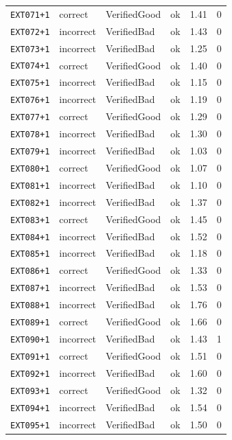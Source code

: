 \begin{longtable}{@{}l l l l r r@{}}
\texttt{EXT071{+}1} & correct & VerifiedGood & ok & 1.41 & 0 \\
\texttt{EXT072{+}1} & incorrect & VerifiedBad & ok & 1.43 & 0 \\
\texttt{EXT073{+}1} & incorrect & VerifiedBad & ok & 1.25 & 0 \\
\texttt{EXT074{+}1} & correct & VerifiedGood & ok & 1.40 & 0 \\
\texttt{EXT075{+}1} & incorrect & VerifiedBad & ok & 1.15 & 0 \\
\texttt{EXT076{+}1} & incorrect & VerifiedBad & ok & 1.19 & 0 \\
\texttt{EXT077{+}1} & correct & VerifiedGood & ok & 1.29 & 0 \\
\texttt{EXT078{+}1} & incorrect & VerifiedBad & ok & 1.30 & 0 \\
\texttt{EXT079{+}1} & incorrect & VerifiedBad & ok & 1.03 & 0 \\
\texttt{EXT080{+}1} & correct & VerifiedGood & ok & 1.07 & 0 \\
\texttt{EXT081{+}1} & incorrect & VerifiedBad & ok & 1.10 & 0 \\
\texttt{EXT082{+}1} & incorrect & VerifiedBad & ok & 1.37 & 0 \\
\texttt{EXT083{+}1} & correct & VerifiedGood & ok & 1.45 & 0 \\
\texttt{EXT084{+}1} & incorrect & VerifiedBad & ok & 1.52 & 0 \\
\texttt{EXT085{+}1} & incorrect & VerifiedBad & ok & 1.18 & 0 \\
\texttt{EXT086{+}1} & correct & VerifiedGood & ok & 1.33 & 0 \\
\texttt{EXT087{+}1} & incorrect & VerifiedBad & ok & 1.53 & 0 \\
\texttt{EXT088{+}1} & incorrect & VerifiedBad & ok & 1.76 & 0 \\
\texttt{EXT089{+}1} & correct & VerifiedGood & ok & 1.66 & 0 \\
\texttt{EXT090{+}1} & incorrect & VerifiedBad & ok & 1.43 & 1 \\
\texttt{EXT091{+}1} & correct & VerifiedGood & ok & 1.51 & 0 \\
\texttt{EXT092{+}1} & incorrect & VerifiedBad & ok & 1.60 & 0 \\
\texttt{EXT093{+}1} & correct & VerifiedGood & ok & 1.32 & 0 \\
\texttt{EXT094{+}1} & incorrect & VerifiedBad & ok & 1.54 & 0 \\
\texttt{EXT095{+}1} & incorrect & VerifiedBad & ok & 1.50 & 0 \\

\end{longtable}
